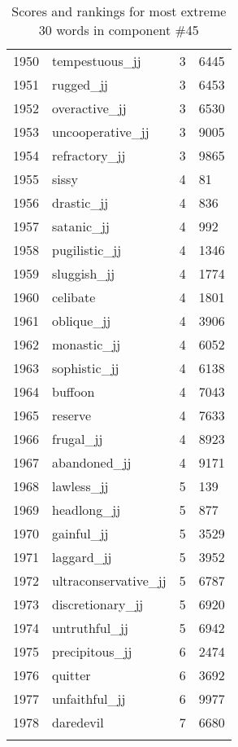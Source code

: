 \begin{longtable}[!htbp]{| rlr@{.}l |}
    1950 & tempestuous\_jj & 3 & 6445 \\
    1951 & rugged\_jj & 3 & 6453 \\
    1952 & overactive\_jj & 3 & 6530 \\
    1953 & uncooperative\_jj & 3 & 9005 \\
    1954 & refractory\_jj & 3 & 9865 \\
    1955 & sissy & 4 & 81 \\
    1956 & drastic\_jj & 4 & 836 \\
    1957 & satanic\_jj & 4 & 992 \\
    1958 & pugilistic\_jj & 4 & 1346 \\
    1959 & sluggish\_jj & 4 & 1774 \\
    1960 & celibate & 4 & 1801 \\
    1961 & oblique\_jj & 4 & 3906 \\
    1962 & monastic\_jj & 4 & 6052 \\
    1963 & sophistic\_jj & 4 & 6138 \\
    1964 & buffoon & 4 & 7043 \\
    1965 & reserve & 4 & 7633 \\
    1966 & frugal\_jj & 4 & 8923 \\
    1967 & abandoned\_jj & 4 & 9171 \\
    1968 & lawless\_jj & 5 & 139 \\
    1969 & headlong\_jj & 5 & 877 \\
    1970 & gainful\_jj & 5 & 3529 \\
    1971 & laggard\_jj & 5 & 3952 \\
    1972 & ultraconservative\_jj & 5 & 6787 \\
    1973 & discretionary\_jj & 5 & 6920 \\
    1974 & untruthful\_jj & 5 & 6942 \\
    1975 & precipitous\_jj & 6 & 2474 \\
    1976 & quitter & 6 & 3692 \\
    1977 & unfaithful\_jj & 6 & 9977 \\
    1978 & daredevil & 7 & 6680 \\
    \hline
    \caption{Scores and rankings for most extreme 30 words in component \#45} \\
\end{longtable}
